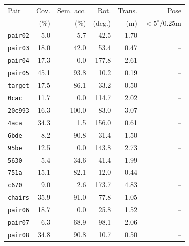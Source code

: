 \begin{tabular}{lrrrrr}
\toprule
Pair & Cov. & Sem. acc. & Rot. & Trans. & Pose \\ 
 & (\%) & (\%) & (deg.) & (m) & $<5^\circ/0.25$m \\ 
\midrule
\texttt{pair02} & 5.0 & 5.7 & 42.5 & 1.70 & -- \\
\texttt{pair03} & 18.0 & 42.0 & 53.4 & 0.47 & -- \\
\texttt{pair04} & 17.3 & 0.0 & 177.8 & 2.61 & -- \\
\texttt{pair05} & 45.1 & 93.8 & 10.2 & 0.19 & -- \\
\texttt{target} & 17.5 & 86.1 & 33.2 & 0.50 & -- \\
\texttt{0cac} & 11.7 & 0.0 & 114.7 & 2.02 & -- \\
\texttt{20c993} & 16.3 & 100.0 & 83.0 & 3.07 & -- \\
\texttt{4aca} & 34.3 & 1.5 & 156.0 & 0.61 & -- \\
\texttt{6bde} & 8.2 & 90.8 & 31.4 & 1.50 & -- \\
\texttt{95be} & 12.5 & 0.0 & 143.8 & 2.73 & -- \\
\texttt{5630} & 5.4 & 34.6 & 41.4 & 1.99 & -- \\
\texttt{751a} & 15.1 & 82.1 & 12.0 & 0.44 & -- \\
\texttt{c670} & 9.0 & 2.6 & 173.7 & 4.83 & -- \\
\texttt{chairs} & 35.9 & 91.0 & 77.8 & 1.05 & -- \\
\texttt{pair06} & 18.7 & 0.0 & 25.8 & 1.52 & -- \\
\texttt{pair07} & 6.3 & 68.9 & 98.1 & 2.06 & -- \\
\texttt{pair08} & 34.8 & 90.8 & 10.7 & 0.50 & -- \\
\bottomrule
\end{tabular}
